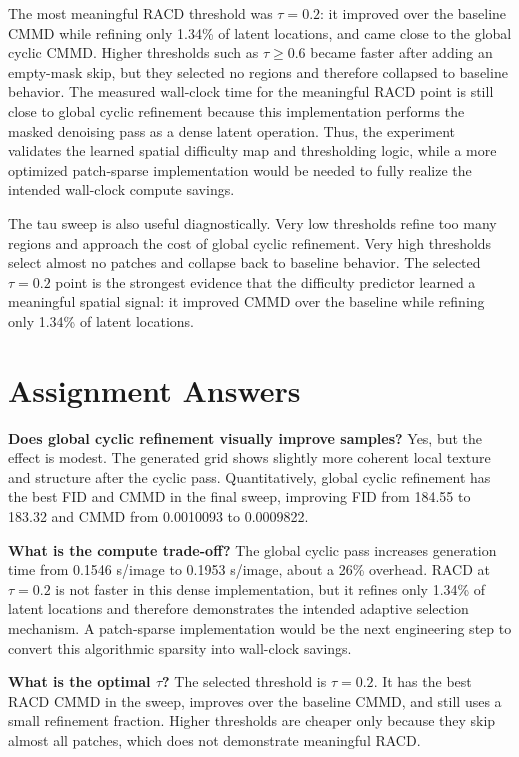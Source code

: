 \documentclass{article}
\begin{document}
The most meaningful RACD threshold was $\tau=0.2$: it improved over the
baseline CMMD while refining only 1.34\% of latent locations, and came close to
the global cyclic CMMD. Higher thresholds such as $\tau \ge 0.6$ became faster
after adding an empty-mask skip, but they selected no regions and therefore
collapsed to baseline behavior. The measured wall-clock time for the meaningful
RACD point is still close to global cyclic refinement because this
implementation performs the masked denoising pass as a dense latent operation.
Thus, the experiment validates the learned spatial difficulty map and
thresholding logic, while a more optimized patch-sparse implementation would be
needed to fully realize the intended wall-clock compute savings.

The tau sweep is also useful diagnostically. Very low thresholds refine too
many regions and approach the cost of global cyclic refinement. Very high
thresholds select almost no patches and collapse back to baseline behavior.
The selected $\tau=0.2$ point is the strongest evidence that the difficulty
predictor learned a meaningful spatial signal: it improved CMMD over the
baseline while refining only 1.34\% of latent locations.

\section{Assignment Answers}

\textbf{Does global cyclic refinement visually improve samples?} Yes, but the
effect is modest. The generated grid shows slightly more coherent local texture
and structure after the cyclic pass. Quantitatively, global cyclic refinement
has the best FID and CMMD in the final sweep, improving FID from 184.55 to
183.32 and CMMD from 0.0010093 to 0.0009822.

\textbf{What is the compute trade-off?} The global cyclic pass increases
generation time from 0.1546 s/image to 0.1953 s/image, about a 26\% overhead.
RACD at $\tau=0.2$ is not faster in this dense implementation, but it refines
only 1.34\% of latent locations and therefore demonstrates the intended
adaptive selection mechanism. A patch-sparse implementation would be the next
engineering step to convert this algorithmic sparsity into wall-clock savings.

\textbf{What is the optimal $\tau$?} The selected threshold is $\tau=0.2$. It
has the best RACD CMMD in the sweep, improves over the baseline CMMD, and still
uses a small refinement fraction. Higher thresholds are cheaper only because
they skip almost all patches, which does not demonstrate meaningful RACD.
\end{document}
